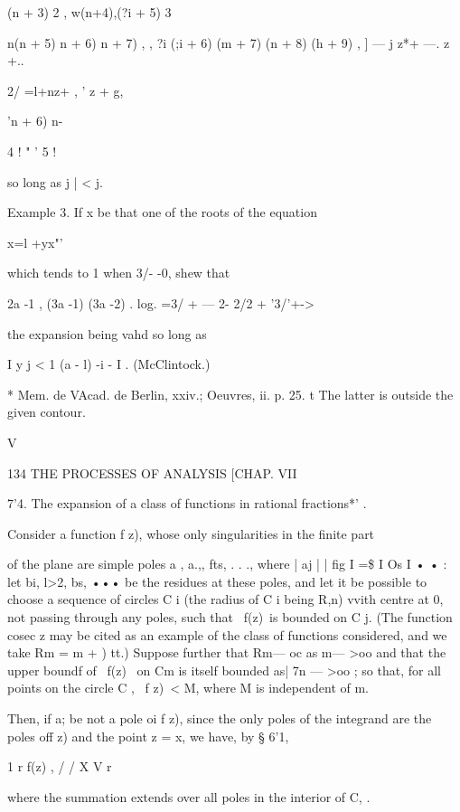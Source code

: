  (n + 3) 2 , w(n+4),(?i + 5) 3 



n(n + 5) n + 6) n + 7) , , ?i (;i + 6) (m + 7) (n + 8) (h + 9) , 
 ] — j z*+ —. z +.. 



2/ =l+nz+  , ' z + g, 

'n + 6) n- 

4 ! " ' 5 ! 

so long as j   | < j. 

Example 3. If x be that one of the roots of the equation 

x=l +yx"' 

which tends to 1 when 3/- -0, shew that 

2a -1 , (3a -1) (3a -2)   . 
log.  =3/ + — 2- 2/2 +    '3/'+-> 

the expansion being vahd so long as 

I y j < 1 (a - l) -i  -  I . (McClintock.) 

* Mem. de VAcad. de Berlin, xxiv.; Oeuvres, ii. p. 25. 
t The latter is outside the given contour. 



V 



134 THE PROCESSES OF ANALYSIS [CHAP. VII 

  7'4. The expansion of a class of functions in rational fractions*' . 

  Consider a function f z), whose only singularities in the finite part 

of the plane are simple poles a   , a.,, fts, . . ., where | aj |   | fig I =\$ I Os I   •   • : let 
bi, l>2, bs, ••• be the residues at these poles, and let it be possible to choose a 
sequence of circles C i (the radius of C i being R,n) vvith centre at 0, not 
passing through any poles, such that \ f(z)\ is bounded on C j. (The function 
cosec z may be cited as an example of the class of functions considered, and 
we take Rm =  m +  ) tt.) Suppose further that Rm— oc as m— >oo and that 
the upper boundf of \ f(z) \ on Cm is itself bounded as| 7n — >oo ; so that, for all 
points on the circle C , \ f z)\ <  M, where M is independent of m. 

Then, if a; be not a pole oi f z), since the only poles of the integrand are 
the poles off z) and the point z = x, we have, by § 6'1, 

1 r f(z) , / / X V  r 

where the summation extends over all poles in the interior of C, . 

